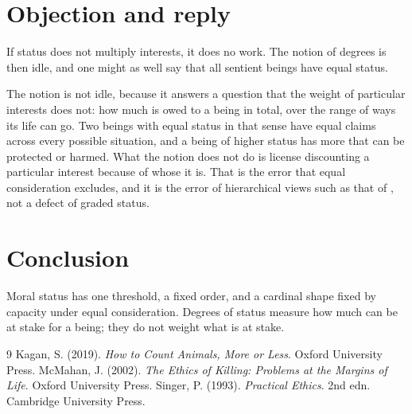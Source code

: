 \documentclass{situationist-preprint}
\begin{document}
\section{Objection and reply}

\begin{objection}
If status does not multiply interests, it does no work. The notion of degrees is then idle, and one might as well say that all sentient beings have equal status.
\end{objection}

\begin{reply}
The notion is not idle, because it answers a question that the weight of particular interests does not: how much is owed to a being in total, over the range of ways its life can go. Two beings with equal status in that sense have equal claims across every possible situation, and a being of higher status has more that can be protected or harmed. What the notion does not do is license discounting a particular interest because of whose it is. That is the error that equal consideration excludes, and it is the error of hierarchical views such as that of \citet{Kagan2019}, not a defect of graded status.
\end{reply}

\section{Conclusion}

Moral status has one threshold, a fixed order, and a cardinal shape fixed by capacity under equal consideration. Degrees of status measure how much can be at stake for a being; they do not weight what is at stake.

\begin{thebibliography}{9}\small
{} Kagan, S. (2019). \emph{How to Count Animals, More or Less}. Oxford University Press.
 McMahan, J. (2002). \emph{The Ethics of Killing: Problems at the Margins of Life}. Oxford University Press.
 Singer, P. (1993). \emph{Practical Ethics}. 2nd edn. Cambridge University Press.
\end{thebibliography}
\end{document}
